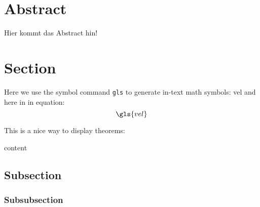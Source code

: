 \newpage

\section{Abstract}
Hier kommt das Abstract hin!


\newpage
{}
\section{Section} \label{sec:section}
	\blindtext
	
	Here we use the symbol command \verb|gls| to generate in-text math symbols: \gls{vel} and here in in equation:
	\begin{equation}
		\gls{vel}
	\end{equation}
	
	This is a nice way to display theorems:
	\begin{theorem}[Title]
		content
	\end{theorem}
	\subsection{Subsection} \label{sec:subsection}
		\blindtext
		\subsubsection{Subsubsection} \label{sec:subsubsection}
			\blindtext
			\blindtext
			\blindtext

\onecolumn

\printbibliography

	


